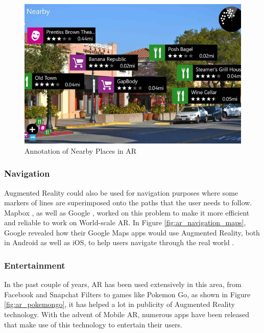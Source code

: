 \begin{figure}
    \centering
        \includegraphics[width=1.00\textwidth]{images/ar_annotation.png}
    \caption{Annotation of Nearby Places in AR}
    \label{fig:ar_annotation}
\end{figure}


\subsubsection{Navigation}
Augmented Reality could also be used for navigation purposes where some markers of lines are superimposed onto the paths that the user needs to follow. Mapbox \cite{MapboxAR2017}, as well as Google \cite{Maps2018}, worked on this problem to make it more efficient and reliable to work on World-scale AR. In Figure \ref{fig:ar_navigation_maps}, Google revealed how their Google Maps apps would use Augmented Reality, both in Android as well as iOS, to help users navigate through the real world \cite{Maps2018}.

\subsubsection{Entertainment}
In the past couple of years, AR has been used extensively in this area, from Facebook and Snapchat Filters to games like Pokemon Go, as shown in Figure \ref{fig:ar_pokemongo}, it has helped a lot in publicity of Augmented Reality technology. With the advent of Mobile AR, numerous apps have been released that make use of this technology to entertain their users.

